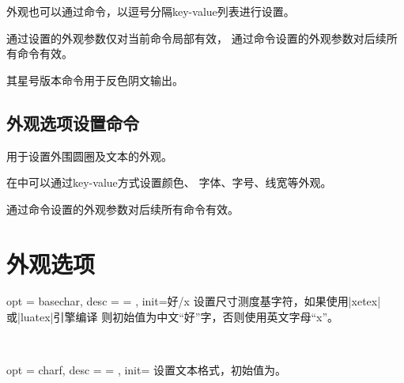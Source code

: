 \documentclass[full]{l3doc}
\begin{document}
\begin{documentation}
  外观也可以通过命令，以逗号分隔key-value列表进行设置。

  通过设置的外观参数仅对当前命令局部有效，
  通过命令设置的外观参数对后续所有命令有效。

  其星号版本命令用于反色阴文输出。

\begin{SideBySideExample}[frame=single,numbers=left,xrightmargin=.45\linewidth,gobble=2]
  \centering
  \quad
  \quad
  \quad
\end{SideBySideExample}

\subsection{外观选项设置命令}

\begin{function}{\circledtextset}
  \begin{syntax}
     
  \end{syntax}
\end{function}

  用于设置外围圆圈及文本的外观。

  在中可以通过key-value方式设置颜色、
  字体、字号、线宽等外观。

  通过命令设置的外观参数对后续所有命令有效。

\section{外观选项}

\begin{option}{ opt = basechar, desc = {= }, init=好/x }
  设置尺寸测度基字符，如果使用|xetex|或|luatex|引擎编译
  则初始值为中文“好”字，否则使用英文字母``x''。
\end{option}\\
\begin{SideBySideExample}[frame=single,numbers=left,xrightmargin=.45\linewidth,gobble=2]
  \centering
  \quad
  \quad
\end{SideBySideExample}

\bigskip

\begin{option}{ opt = charf, desc = {= }, init= }
  设置文本格式，初始值为。
\end{option}\\
\begin{SideBySideExample}[frame=single,numbers=left,xrightmargin=.45\linewidth,gobble=2]
  \centering
  \qquad
\end{SideBySideExample}


\end{documentation}
\end{document}
